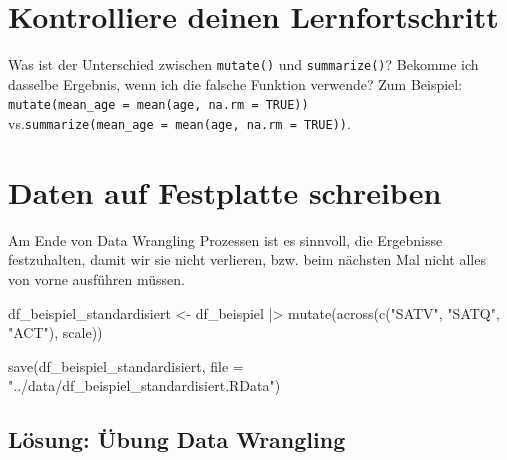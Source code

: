\documentclass[
  letterpaper,
  DIV=11,
  numbers=noendperiod]{scrreprt}
\newenvironment{Shaded}{\begin{snugshade}}{\end{snugshade}}
\newcommand{\AttributeTok}[1]{\textcolor[rgb]{0.40,0.45,0.13}{#1}}
\newcommand{\FunctionTok}[1]{\textcolor[rgb]{0.28,0.35,0.67}{#1}}
\newcommand{\NormalTok}[1]{\textcolor[rgb]{0.00,0.23,0.31}{#1}}
\newcommand{\OtherTok}[1]{\textcolor[rgb]{0.00,0.23,0.31}{#1}}
\newcommand{\SpecialCharTok}[1]{\textcolor[rgb]{0.37,0.37,0.37}{#1}}
\newcommand{\StringTok}[1]{\textcolor[rgb]{0.13,0.47,0.30}{#1}}
\begin{document}
\chapter{Kontrolliere deinen
Lernfortschritt}\label{kontrolliere-deinen-lernfortschritt}

Was ist der Unterschied zwischen \texttt{mutate()} und
\texttt{summarize()}? Bekomme ich dasselbe Ergebnis, wenn ich die
falsche Funktion verwende? Zum Beispiel:
\texttt{mutate(mean\_age\ =\ mean(age,\ na.rm\ =\ TRUE))}
vs.\texttt{summarize(mean\_age\ =\ mean(age,\ na.rm\ =\ TRUE))}.


\chapter{Daten auf Festplatte
schreiben}\label{daten-auf-festplatte-schreiben}

Am Ende von Data Wrangling Prozessen ist es sinnvoll, die Ergebnisse
festzuhalten, damit wir sie nicht verlieren, bzw. beim nächsten Mal
nicht alles von vorne ausführen müssen.

\begin{Shaded}
\begin{Highlighting}[]
\NormalTok{df\_beispiel\_standardisiert }\OtherTok{\textless{}{-}}\NormalTok{ df\_beispiel }\SpecialCharTok{|\textgreater{}} \FunctionTok{mutate}\NormalTok{(}\FunctionTok{across}\NormalTok{(}\FunctionTok{c}\NormalTok{(}\StringTok{"SATV"}\NormalTok{, }\StringTok{"SATQ"}\NormalTok{, }\StringTok{"ACT"}\NormalTok{),}
\NormalTok{                                                           scale))}

\FunctionTok{save}\NormalTok{(df\_beispiel\_standardisiert, }\AttributeTok{file =}  \StringTok{"../data/df\_beispiel\_standardisiert.RData"}\NormalTok{)}
\end{Highlighting}
\end{Shaded}

\section{Lösung: Übung Data
Wrangling}\label{luxf6sung-uxfcbung-data-wrangling}
\end{document}
